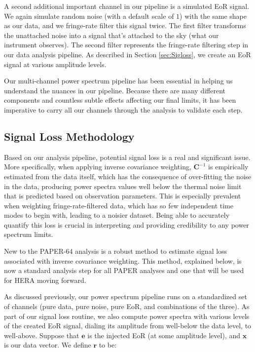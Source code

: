 \documentclass[preprint2,numberedappendix,tighten,twocolappendix]{aastex6}  %
\begin{document}
A second additional important channel in our pipeline is a simulated EoR signal. We again simulate random noise (with a default scale of $1$) with the same shape as our data, and we fringe-rate filter this signal twice. The first filter transforms the unattached noise into a signal that's attached to the sky (what our instrument observes). The second filter represents the fringe-rate filtering step in our data analysis pipeline. As described in Section \ref{sec:Sigloss}, we create an EoR signal at various amplitude levels.

Our multi-channel power spectrum pipeline has been essential in helping us understand the nuances in our pipeline. Because there are many different components and countless subtle effects affecting our final limits, it has been imperative to carry all our channels through the analysis to validate each step.

\subsection{Signal Loss Methodology} 

Based on our analysis pipeline, potential signal loss is a real and significant issue. More specifically, when applying inverse covariance weighting, $\textbf{C}^{-1}$ is empirically estimated from the data itself, which has the consequence of over-fitting the noise in the data, producing power spectra values well below the thermal noise limit that is predicted based on observation parameters. This is especially prevalent when weighting fringe-rate-filtered data, which has so few independent time modes to begin with, leading to a noisier dataset. Being able to accurately quantify this loss is crucial in interpreting and providing credibility to any power spectrum limits. 

New to the PAPER-64 analysis is a robust method to estimate signal loss associated with inverse covariance weighting. This method, explained below, is now a standard analysis step for all PAPER analyses and one that will be used for HERA moving forward.

As discussed previously, our power spectrum pipeline runs on a standardized set of channels (pure data, pure noise, pure EoR, and combinations of the three). As part of our signal loss routine, we also compute power spectra with various levels of the created EoR signal, dialing its amplitude from well-below the data level, to well-above. Suppose that $\textbf{e}$ is the injected EoR (at some amplitude level), and $\textbf{x}$ is our data vector. We define $\textbf{r}$ to be:
\end{document}
